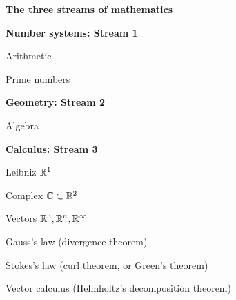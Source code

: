 \documentclass{ximera}
\begin{document}
\begin{center}
\footnotesize
\begin{minipage}{.65\textwidth}
\begin{tcolorbox}
{\bf \large The three streams of mathematics}
\label{box:FundamentalThms}
 \Be %
\item {\bf Number systems: Stream 1}
	\Bi
\item Arithmetic
\item Prime numbers
	\Ei
\item {\bf Geometry: Stream 2}
	\Bi
\item Algebra
	\Ei
\item {\bf Calculus: Stream 3}
\citep{Flanders80}
	\Bi
\item Leibniz $\mathbb{R}^1$
\item Complex $\mathbb{C} \subset \mathbb{R}^2$
\item Vectors $\mathbb{R}^3, \mathbb{R}^n, \mathbb{R}^\infty$
 \Bi
\item Gauss's law (divergence theorem)
\item Stokes's law (curl theorem, or Green's theorem)
\item Vector calculus (Helmholtz's decomposition theorem)  %
 \Ei
{}
	\Ei
\Ee %
\end{tcolorbox}
\end{minipage}
\end{center}


\end{document}

